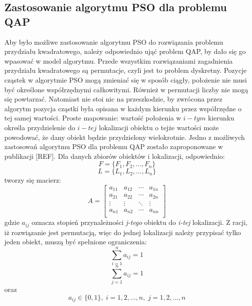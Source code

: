 \subsection{Zastosowanie algorytmu PSO dla problemu QAP}
Aby było możliwe zastosowanie algorytmu PSO do rozwiązania problemu przydziału kwadratowego, należy odpowiednio ująć problem QAP, by dało się go wpasować w model algorytmu. Przede wszystkim rozwiązaniami zagadnienia przydziału kwadratowego są permutacje, czyli jest to problem dyskretny. Pozycje cząstek w algorytmie PSO mogą zmieniać się w sposób ciągły, położenie nie musi być określone współrzędnymi całkowitymi. Również w permutacji liczby nie mogą się powtarzać. Natomiast nie stoi nic na przeszkodzie, by zwrócona przez algorytm pozycja cząstki była opisana w każdym kierunku przez współrzędne o tej samej wartości. Proste mapowanie: wartość położenia w $i-tym$ kierunku określa przydzielenie do $i-tej$ lokalizacji obiektu o tejże wartości może powodować, że dany obiekt będzie przydzielony wielokrotnie.
Jedno z możliwych zastosowań algorytmu PSO dla problemu QAP zostało zaproponowane w publikacji [REF]. Dla danych zbiorów obiektów i lokalizacji, odpowiednio:
\newline
\begin{equation}
F=\{F_1,F_2,...,F_n\}
\end{equation}
\newline
\begin{equation}
L=\{L_1,L_2,...,L_n\}
\end{equation}
\newline
tworzy się macierz:
\newline
\begin{equation}
\label{PSO_A}
A=
\begin{bmatrix}
a_{11} & a_{12} & \cdots & a_{1n} \\
a_{21} & a_{22} & \cdots & a_{2n} \\
\vdots & \vdots & \ddots & \vdots \\
a_{n1} & a_{n2} & \cdots & a_{nn} \\
\end{bmatrix}
\end{equation}
\newline
gdzie $a_{ij}$ oznacza stopień przynależności \textit{j-tego} obiektu do \textit{i-tej} lokalizacji. Z racji, iż rozwiązanie jest permutacją, więc do jednej lokalizacji należy przypisać tylko jeden obiekt, muszą być spełnione ograniczenia:
\newline
\begin{equation}
\label{pso_suma_po_i}
\sum\limits_{i=1}^n a_{ij}=1
\end{equation}
\newline
\begin{equation}
\label{pso_suma_po_j}
\sum\limits_{j=1}^n a_{ij}=1
\end{equation}
\newline
oraz
\newline
\begin{equation}
a_{ij} \in \{0,1\}, \; i=1,2,...,n, \; j=1,2,...,n
\end{equation}
\newline

